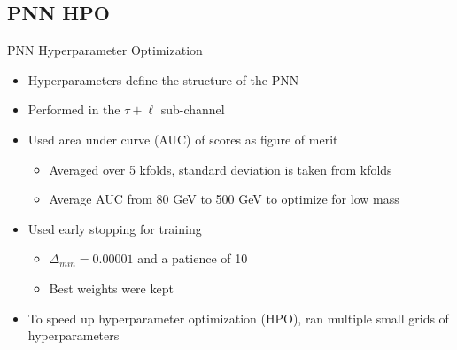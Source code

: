 \documentclass[aspectratio=169,xcolor=table]{beamer}
\begin{document}
  \subsection{ PNN HPO }

    \begin{frame}[t]{PNN Hyperparameter Optimization}
      \begin{itemize}
        \item Hyperparameters define the structure of the PNN
        \item Performed in the $\tau+\ell$ sub-channel
        \item Used area under curve (AUC) of scores as figure of merit
        \begin{itemize}
          \item Averaged over 5 kfolds, standard deviation is taken from kfolds
          \item Average AUC from 80 GeV to 500 GeV to optimize for low mass
        \end{itemize}
          \item Used early stopping for training
          \begin{itemize}
            \item $\Delta_{min}=0.00001$ and a patience of 10
            \item Best weights were kept
          \end{itemize}
        \item To speed up hyperparameter optimization (HPO), ran multiple small grids of hyperparameters
        \begin{itemize}
          \vspace{-.2cm}
\end{itemize}
\end{itemize}
\end{frame}
\end{document}
